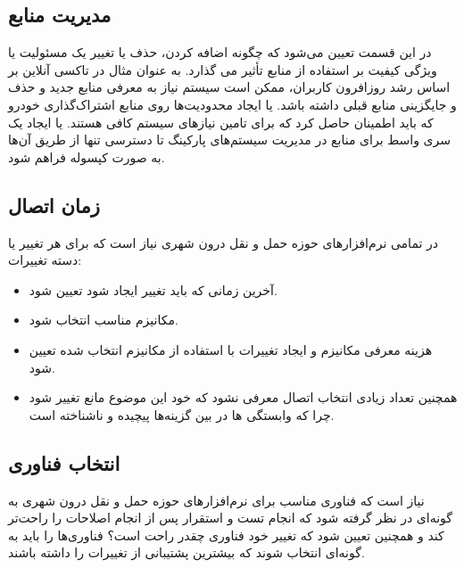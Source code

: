 \subsection{مدیریت منابع}
در این قسمت تعیین می‌شود که چگونه اضافه کردن، حذف یا تغییر یک مسئولیت یا ویژگی کیفیت بر استفاده از منابع تأثیر می گذارد. به عنوان مثال در تاکسی آنلاین بر اساس رشد روزافرون کاربران، ممکن است سیستم نیاز به معرفی منابع جدید و حذف و جایگزینی منابع قبلی داشته باشد. یا ایجاد محدودیت‌ها روی منابع اشتراک‌گذاری خودرو که باید اطمینان حاصل کرد که برای تامین نیازهای سیستم کافی هستند. یا ایجاد یک سری واسط برای منابع در مدیریت سیستم‌های پارکینگ تا دسترسی تنها از طریق آن‌ها به صورت کپسوله فراهم شود.
\subsection{زمان اتصال}
در تمامی نرم‌افزارهای حوزه حمل و نقل درون شهری نیاز است که برای هر تغییر یا دسته تغییرات:
\begin{itemize}
\item
آخرین زمانی که باید تغییر ایجاد شود تعیین شود.
\item
مکانیزم مناسب انتخاب شود.
\item
هزینه معرفی مکانیزم و ایجاد تغییرات با استفاده از مکانیزم انتخاب شده تعیین شود.
\item
همچنین تعداد زیادی انتخاب اتصال معرفی نشود که خود این موضوع مانع تغییر شود چرا که وابستگی ها در بین گزینه‌ها پیچیده و ناشناخته است.
\end{itemize}
\subsection{انتخاب فناوری}
نیاز است که فناوری مناسب برای نرم‌افزارهای حوزه حمل و نقل درون شهری به گونه‌ای در نظر گرفته شود که انجام تست و استقرار پس از انجام اصلاحات را راحت‌تر کند و همچنین تعیین شود که تغییر خود فناوری چقدر راحت است؟ فناوری‌ها را باید به گونه‌ای انتخاب شوند که بیشترین پشتیبانی از تغییرات را داشته باشند.

